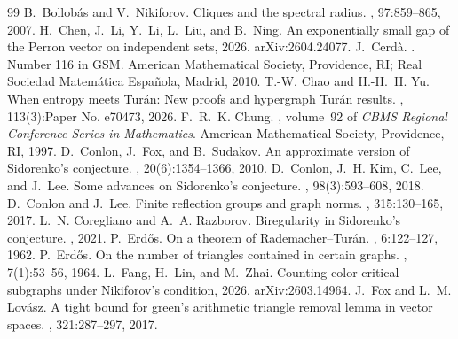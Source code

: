 \documentclass[10pt,a4paper]{amsart}
\begin{document}
\begin{thebibliography}{99}
 B.~Bollob{\'a}s and V.~Nikiforov. \newblock Cliques and the spectral radius. , 97:859--865, 2007.
 H.~Chen, J.~Li, Y.~Li, L.~Liu, and B.~Ning. \newblock An exponentially small gap of the {Perron} vector on independent sets, 2026. \newblock arXiv:2604.24077.
 J.~Cerd\`{a}. . \newblock Number 116 in GSM. American Mathematical Society, Providence, RI; Real Sociedad Matem\'{a}tica Espa\~nola, Madrid, 2010.
 T.-W. Chao and H.-H.~H. Yu. \newblock When entropy meets {Turán}: {New} proofs and hypergraph {Turán} results. , 113(3):Paper No. e70473, 2026.
 F.~R.~K. Chung. , volume~92 of {\em CBMS Regional Conference Series in Mathematics}. \newblock American Mathematical Society, Providence, RI, 1997.
 D.~Conlon, J.~Fox, and B.~Sudakov. \newblock An approximate version of {Sidorenko}'s conjecture. , 20(6):1354--1366, 2010.
 D.~Conlon, J.~H. Kim, C.~Lee, and J.~Lee. \newblock Some advances on {S}idorenko's conjecture. , 98(3):593--608, 2018.
 D.~Conlon and J.~Lee. \newblock Finite reflection groups and graph norms. , 315:130--165, 2017.
 L.~N. Coregliano and A.~A. Razborov. \newblock Biregularity in {Sidorenko}'s conjecture. , 2021.
 P.~Erd\H{o}s. \newblock On a theorem of {Rademacher--Tur\'{a}n}. , 6:122--127, 1962.
 P.~Erdős. \newblock On the number of triangles contained in certain graphs. , 7(1):53--56, 1964.
 L.~Fang, H.~Lin, and M.~Zhai. \newblock Counting color-critical subgraphs under {Nikiforov's} condition, 2026. \newblock arXiv:2603.14964.
 J.~Fox and L.~M. Lov{\'a}sz. \newblock A tight bound for green's arithmetic triangle removal lemma in vector spaces. , 321:287--297, 2017.

\end{thebibliography}
\end{document}
